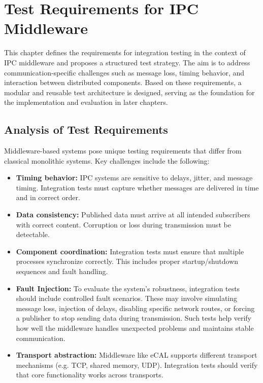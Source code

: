 \clearpage

\section{Test Requirements for IPC Middleware}

This chapter defines the requirements for integration testing in the context of IPC middleware and proposes a structured test strategy. The aim is to address communication-specific challenges such as message loss, timing behavior, and interaction between distributed components. Based on these requirements, a modular and reusable test architecture is designed, serving as the foundation for the implementation and evaluation in later chapters.

\subsection{Analysis of Test Requirements}

Middleware-based systems pose unique testing requirements that differ from classical monolithic systems. Key challenges include the following:

\begin{itemize}
	\item \textbf{Timing behavior:} IPC systems are sensitive to delays, jitter, and message timing. Integration tests must capture whether messages are delivered in time and in correct order.
	
	\item \textbf{Data consistency:} Published data must arrive at all intended subscribers with correct content. Corruption or loss during transmission must be detectable.
	
	\item \textbf{Component coordination:} Integration tests must ensure that multiple processes synchronize correctly. This includes proper startup/shutdown sequences and fault handling.
	
	\item \textbf{Fault Injection:} To evaluate the system’s robustness, integration tests should include controlled fault scenarios. These may involve simulating message loss, injection of delays, disabling specific network routes, or forcing a publisher to stop sending data during transmission. Such tests help verify how well the middleware handles unexpected problems and maintains stable communication.
	
	\item \textbf{Transport abstraction:} Middleware like eCAL supports different transport mechanisms (e.g. TCP, shared memory, UDP). Integration tests should verify that core functionality works across transports.
\end{itemize}


